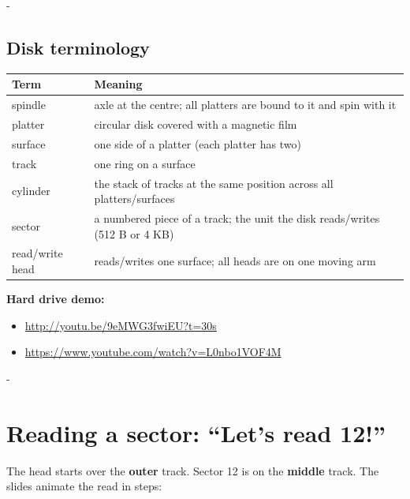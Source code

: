 \documentclass[11pt,a4paper]{article}
\makeatletter
\newcommand{\keepspace}[1]{\par\penalty-100\begingroup
  \setlength{\dimen@}{#1}\dimen@ii\pagegoal\advance\dimen@ii-\pagetotal
  \ifdim\dimen@>\dimen@ii\ifdim\dimen@ii>\z@\vfil\fi\break\fi\endgroup}
\makeatother
\begin{document}
\keepspace{16\baselineskip}
\subsection{Disk terminology}

\begin{center}
\renewcommand{\arraystretch}{1.18}
\begin{tabularx}{\textwidth}{@{}lX@{}}
  \toprule
  \textbf{Term} & \textbf{Meaning} \\
  \midrule
  spindle & axle at the centre; all platters are bound to it and spin with it \\
  platter & circular disk covered with a magnetic film \\
  surface & one side of a platter (each platter has two) \\
  track & one ring on a surface \\
  cylinder & the stack of tracks at the same position across all platters/surfaces \\
  sector & a numbered piece of a track; the unit the disk reads/writes (512 B or 4 KB) \\
  read/write head & reads/writes one surface; all heads are on one moving arm \\
  \bottomrule
\end{tabularx}
\end{center}

\noindent\textbf{Hard drive demo:}
\begin{itemize}
  \item \url{http://youtu.be/9eMWG3fwiEU?t=30s}
  \item \url{https://www.youtube.com/watch?v=L0nbo1VOF4M}
\end{itemize}

\keepspace{24\baselineskip}
\section{Reading a sector: ``Let's read 12!''}

The head starts over the \textbf{outer} track. Sector 12 is on the
\textbf{middle} track. The slides animate the read in steps:
\end{document}
